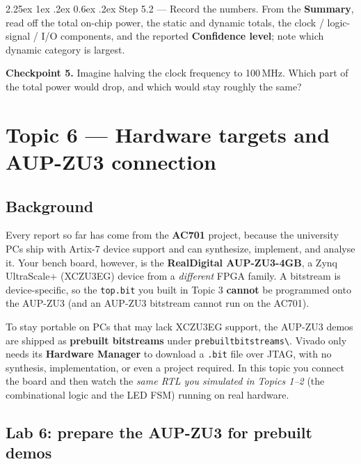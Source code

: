\documentclass[11pt]{article}
\makeatletter
\newcommand{\nav}[1]{\textsf{\textbf{#1}}}
\renewcommand{\_}{\textunderscore\allowbreak}
\let\origtextbackslash\textbackslash
\renewcommand{\textbackslash}{\origtextbackslash\allowbreak}
\renewcommand\paragraph{\@startsection{paragraph}{4}{\z@}%
  {2.25ex \@plus 1ex \@minus .2ex}%
  {0.6ex \@plus .2ex}%
  {\normalfont\normalsize\bfseries}}
\makeatother
\begin{document}
\paragraph{Step 5.2 --- Record the numbers.}
From the \nav{Summary}, read off the total on-chip power, the static and dynamic totals, the clock /
logic-signal / I/O components, and the reported \nav{Confidence level}; note which dynamic category is
largest.

\begin{questionbox}
\textbf{Checkpoint 5.}
Imagine halving the clock frequency to 100\,MHz. Which part of the total power would drop, and which
        would stay roughly the same?
\end{questionbox}

\newpage
\section{Topic 6 --- Hardware targets and AUP-ZU3 connection}

\subsection{Background}
Every report so far has come from the \textbf{AC701} project, because the university PCs ship with Artix-7
device support and can synthesize, implement, and analyse it. Your bench board, however, is the
\textbf{RealDigital AUP-ZU3-4GB}, a Zynq UltraScale+ (XCZU3EG) device from a \emph{different} FPGA family.
A bitstream is device-specific, so the \texttt{top.bit} you built in Topic 3 \textbf{cannot} be programmed
onto the AUP-ZU3 (and an AUP-ZU3 bitstream cannot run on the AC701).

To stay portable on PCs that may lack XCZU3EG support, the AUP-ZU3 demos are shipped as \textbf{prebuilt
bitstreams} under \texttt{prebuilt\_bitstreams\textbackslash}. Vivado only needs its \textbf{Hardware
Manager} to download a \texttt{.bit} file over JTAG, with no synthesis, implementation, or even a project
required. In this topic you connect the board and then watch the \emph{same RTL you simulated in Topics
1--2} (the combinational logic and the LED FSM) running on real hardware.

\subsection{Lab 6: prepare the AUP-ZU3 for prebuilt demos}
\end{document}
